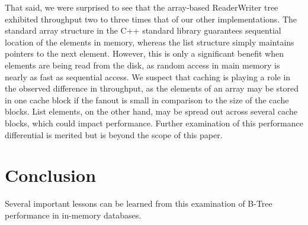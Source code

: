 \documentclass{sig-alternate}
\begin{document}
That said, we were surprised to see that the array-based ReaderWriter tree exhibited throughput two to three times that of our other implementations. The standard array structure in the C++ standard library guarantees sequential location of the elements in memory, whereas the list structure simply maintains pointers to the next element. However, this is only a significant benefit when elements are being read from the disk, as random access in main memory is nearly as fast as sequential access. We suspect that caching is playing a role in the observed difference in throughput, as the elements of an array may be stored in one cache block if the fanout is small in comparison to the size of the cache blocks. List elements, on the other hand, may be spread out across several cache blocks, which could impact performance. Further examination of this performance differential is merited but is beyond the scope of this paper.

\section{Conclusion}
Several important lessons can be learned from this examination of B-Tree performance in in-memory databases.
\end{document}
